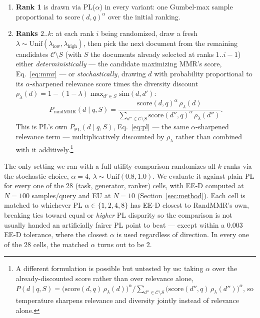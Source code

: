 \documentclass[10pt,twocolumn]{article}
\begin{document}
\begin{enumerate}[leftmargin=1.4em,itemsep=2pt]
  \item \textbf{Rank 1} is drawn via PL($\alpha$) in every variant: one
  Gumbel-max sample proportional to $\mathrm{score}(d,q)^\alpha$ over the initial
  ranking.
  \item \textbf{Ranks $2..k$}: at each rank $i$ being randomized, draw a fresh
  $\lambda \sim \mathrm{Unif}(\lambda_{\text{low}}, \lambda_{\text{high}})$, then
  pick the next document from the remaining candidates $\mathcal{C} \setminus S$
  (with $S$ the documents already selected at ranks $1..i{-}1$) either
  \emph{deterministically} --- the candidate maximizing MMR's score,
  Eq.~\eqref{eq:mmr} --- or \emph{stochastically}, drawing $d$ with probability
  proportional to its $\alpha$-sharpened relevance score times the diversity
  discount $\rho_\lambda(d) = 1 - (1-\lambda)\max_{d'\in S}\mathrm{sim}(d,d')$:
  \begin{equation}
  P_{\mathrm{randMMR}}(d \mid q, S) = \frac{\mathrm{score}(d,q)^\alpha\,\rho_\lambda(d)}
  {\displaystyle\sum_{d''\in\mathcal{C}\setminus S} \mathrm{score}(d'',q)^\alpha\,\rho_\lambda(d'')}.
  \label{eq:randmmr-stochastic}
  \end{equation}
  This is PL's own $P_{\mathrm{PL}}(d\mid q,S)$, Eq.~\eqref{eq:pl} --- the same
  $\alpha$-sharpened relevance term --- multiplicatively discounted by
  $\rho_\lambda$ rather than combined with it additively.\footnote{A different
  formulation is possible but untested by us: taking $\alpha$ over the
  already-discounted score rather than over relevance alone, $P(d\mid q,S) =
  \big(\mathrm{score}(d,q)\,\rho_\lambda(d)\big)^\alpha \big/
  \sum_{d''\in\mathcal{C}\setminus S} \big(\mathrm{score}(d'',q)\,\rho_\lambda(d'')\big)^\alpha$,
  so temperature sharpens relevance and diversity jointly instead of relevance
  alone.}
\end{enumerate}

The only setting we ran with a full utility comparison randomizes all $k$
ranks via the stochastic choice, $\alpha{=}4$, $\lambda\sim\mathrm{Unif}(0.8,1.0)$.
We evaluate it
against plain PL for every one of the 28 (task, generator, ranker) cells, with
EE-D computed at $N{=}100$ samples/query and EU at $N{=}10$
(Section~\ref{sec:method}). Each cell is matched to whichever PL
$\alpha \in \{1,2,4,8\}$ has EE-D closest to RandMMR's own, breaking ties toward
equal or \emph{higher} PL disparity so the comparison is not usually handed an
artificially fairer PL point to beat --- except within a 0.003 EE-D tolerance,
where the closest $\alpha$ is used regardless of direction. In every one of
the 28 cells, the matched $\alpha$ turns out to be 2.
\end{document}
